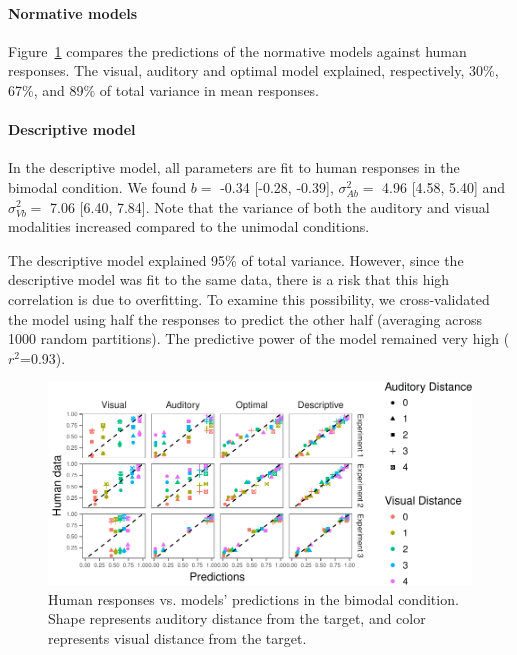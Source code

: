 \documentclass[english,floatsintext,man]{apa6}
\theoremstyle{definition}
\theoremstyle{definition}
\theoremstyle{definition}
\theoremstyle{remark}
\begin{document}
\paragraph{Normative models}\label{normative-models}

Figure~\ref{fig:bimodal} compares the predictions of the normative
models against human responses. The visual, auditory and optimal model
explained, respectively, 30\%, 67\%, and 89\% of total variance in mean
responses.

\paragraph{Descriptive model}\label{descriptive-model}

In the descriptive model, all parameters are fit to human responses in
the bimodal condition. We found \(b=\) -0.34 {[}-0.28, -0.39{]},
\(\sigma^2_{Ab}=\) 4.96 {[}4.58, 5.40{]} and \(\sigma^2_{Vb}=\) 7.06
{[}6.40, 7.84{]}. Note that the variance of both the auditory and visual
modalities increased compared to the unimodal conditions.

\noindent The descriptive model explained 95\% of total variance.
However, since the descriptive model was fit to the same data, there is
a risk that this high correlation is due to overfitting. To examine this
possibility, we cross-validated the model using half the responses to
predict the other half (averaging across 1000 random partitions). The
predictive power of the model remained very high (\(r^2\)=0.93).

\begin{figure}[!h]
\includegraphics[width=\textwidth]{ms_files/figure-latex/bimodal-1} \caption{Human responses vs. models' predictions in the bimodal condition. Shape represents auditory distance from the target, and color represents visual distance from the target.}\label{fig:bimodal}
\end{figure}
\end{document}
